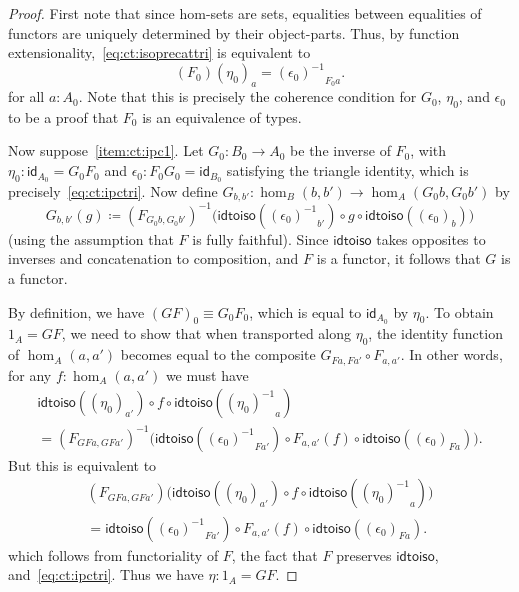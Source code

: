 \documentclass{amsart}
\newcommand{\jdeq}{\equiv}      %
\newcommand{\defeq}{\coloneqq}  %
\newcommand{\opp}[1]{\mathord{{#1}^{-1}}}
\newcommand{\map}[2]{\ensuremath{{#1}\left({#2}\right)}\xspace}
\newcommand{\idfunc}[1][]{\ensuremath{\mathsf{id}_{#1}}\xspace}
\theoremstyle{definition}
\theoremstyle{remark}
\numberwithin{equation}{section}
\newcommand{\inv}[1]{{#1}^{-1}}
\newcommand{\idtoiso}{\ensuremath{\mathsf{idtoiso}}\xspace}
\begin{document}
\begin{proof}
  First note that since hom-sets are sets, equalities between equalities of functors are uniquely determined by their object-parts.
  Thus, by function extensionality,~\eqref{eq:ct:isoprecattri} is equivalent to
  \begin{equation}
    \map{(F_0)}{\eta_0}_a = \opp{(\epsilon_0)}_{F_0 a}.\label{eq:ct:ipctri}
  \end{equation}
  for all $a:A_0$.
  Note that this is precisely the coherence condition for $G_0$, $\eta_0$, and $\epsilon_0$ to be a proof that $F_0$ is an equivalence of types.

  Now suppose~\ref{item:ct:ipc1}.
  Let $G_0:B_0 \to A_0$ be the inverse of $F_0$, with $\eta_0: \idfunc[A_0] = G_0 F_0$ and $\epsilon_0:F_0G_0 = \idfunc[B_0]$ satisfying the triangle identity, which is precisely~\eqref{eq:ct:ipctri}.
  Now define $G_{b,b'}:\hom_B(b,b') \to \hom_A(G_0b,G_0b')$ by
  \[ G_{b,b'}(g) \defeq
  \inv{(F_{G_0b,G_0b'})}\Big(\idtoiso(\opp{(\epsilon_0)}_{b'}) \circ g \circ \idtoiso((\epsilon_0)_b)\Big)
  \]
  (using the assumption that $F$ is fully faithful).
  Since \idtoiso takes opposites to inverses and concatenation to composition, and $F$ is a functor, it follows that $G$ is a functor.

  By definition, we have $(GF)_0 \jdeq G_0 F_0$, which is equal to $\idfunc[A_0]$ by $\eta_0$.
  To obtain $1_A = GF$, we need to show that when transported along $\eta_0$, the identity function of $\hom_A(a,a')$ becomes equal to the composite $G_{Fa,Fa'} \circ F_{a,a'}$.
  In other words, for any $f:\hom_A(a,a')$ we must have
  \begin{multline*}
    \idtoiso((\eta_0)_{a'}) \circ f \circ \idtoiso(\opp{(\eta_0)}_a)\\
    = \inv{(F_{GFa,GFa'})}\Big(\idtoiso(\opp{(\epsilon_0)}_{Fa'})
    \circ F_{a,a'}(f) \circ \idtoiso((\epsilon_0)_{Fa})\Big).
  \end{multline*}
  But this is equivalent to
  \begin{multline*}
    (F_{GFa,GFa'})\Big(\idtoiso((\eta_0)_{a'}) \circ f \circ \idtoiso(\opp{(\eta_0)}_a)\Big)\\
    = \idtoiso(\opp{(\epsilon_0)}_{Fa'})
    \circ F_{a,a'}(f) \circ \idtoiso((\epsilon_0)_{Fa}).
  \end{multline*}
  which follows from functoriality of $F$, the fact that $F$ preserves \idtoiso, and~\eqref{eq:ct:ipctri}.
  Thus we have $\eta:1_A = GF$.


\end{proof}
\end{document}

